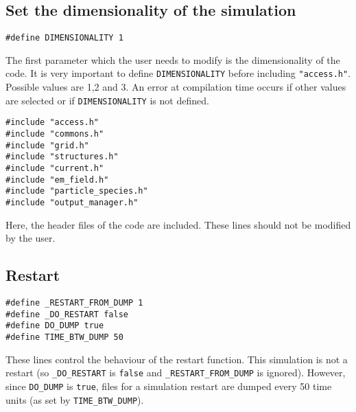\documentclass[11pt,a4paper]{report}
\begin{document}
\subsection*{Set the dimensionality of the simulation}
\begin{lstlisting}
#define DIMENSIONALITY 1
\end{lstlisting}
The first parameter which the user needs to modify is the dimensionality of the code. It is very important to define \verb+DIMENSIONALITY+ before including \verb+"access.h"+. Possible values are 1,2 and 3. An error at compilation time occurs if other values are selected or if \verb+DIMENSIONALITY+ is not defined.
\begin{lstlisting}[backgroundcolor=\color{no_modify}]
#include "access.h"
#include "commons.h"
#include "grid.h"
#include "structures.h"
#include "current.h"
#include "em_field.h"
#include "particle_species.h"
#include "output_manager.h"
\end{lstlisting}
Here, the header files of the code are included. These lines should not be modified by the user.


\subsection*{Restart}
\begin{lstlisting}
#define _RESTART_FROM_DUMP 1
#define _DO_RESTART false
#define DO_DUMP true
#define TIME_BTW_DUMP 50
\end{lstlisting}
These lines control the behaviour of the restart function.
This simulation is not a restart (so \verb+_DO_RESTART+ is \verb+false+ and \verb+_RESTART_FROM_DUMP+ is
ignored). However, since \verb+DO_DUMP+ is \verb+true+, files for a simulation restart are dumped every 50 time units (as set by \verb+TIME_BTW_DUMP+).
\end{document}
